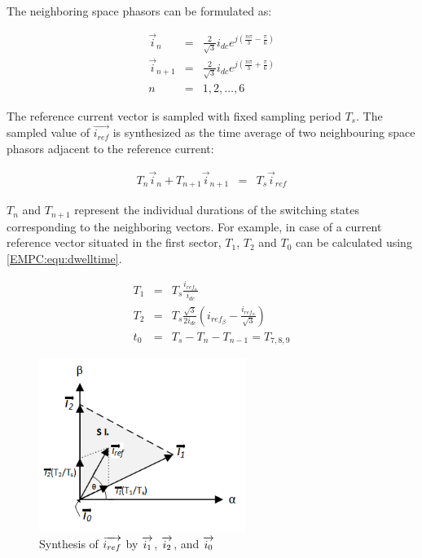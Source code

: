    The neighboring space phasors can be formulated as:

    \begin{equation}
        \begin{array}{rcl}
            \vec{i}_n&=&\frac{2}{\sqrt{3}}i_{dc}e^{j(\frac{n\pi}{3}-\frac{\pi}{6})}\\
            \vec{i}_{n+1}&=&\frac{2}{\sqrt{3}}i_{dc}e^{j(\frac{n\pi}{3}+\frac{\pi}{6})}\\
            n&=&1,2,\dots,6
        \end{array}
        \label{EMPC:equ:neighbor}
    \end{equation}

    The reference current vector is sampled with fixed sampling period $T_s$. The sampled value of $\overrightarrow{i_{ref}}$ is synthesized as the time average of two neighbouring space phasors adjacent to the reference current:

    \begin{equation}
        \begin{array}{rcl}
            T_n\vec{i}_n+T_{n+1}\vec{i}_{n+1}&=&T_s\vec{i}_{ref}
        \end{array}
        \label{EMPC:equ:i_ref}
    \end{equation}

    $T_n$ and $T_{n+1}$ represent the individual durations of the switching states corresponding to the neighboring vectors. For example, in case of a current reference vector situated in the first sector, $T_1$, $T_2$ and $T_0$ can be calculated using \ref{EMPC:equ:dwelltime}.

    \begin{equation}
        \begin{array}{rcl}
            T_1&=&T_s\frac{i_{ref_\alpha}}{i_{dc}}\\
            T_2&=&T_s\frac{\sqrt{3}}{2i_{dc}}(i_{ref_\beta}-\frac{i_{ref_\alpha}}{\sqrt{3}})\\
            t_0&=&T_s-T_n-T_{n-1}=T_{7,8,9}
        \end{array}
        \label{EMPC:equ:dwelltime}
    \end{equation}

    \begin{figure}[!ht]
        \centering
        \includegraphics[width=0.6\textwidth]{EMPC_PNG_Pics/OnePhasor.png}
        \caption{Synthesis of $\protect\overrightarrow{i_{ref}}$ by $\protect\overrightarrow{i_{1}}$, $\protect\overrightarrow{i_{2}}$, and $\protect\overrightarrow{i_{0}}$}
        \label{EMPC:fig:OnePhasor}
    \end{figure}

